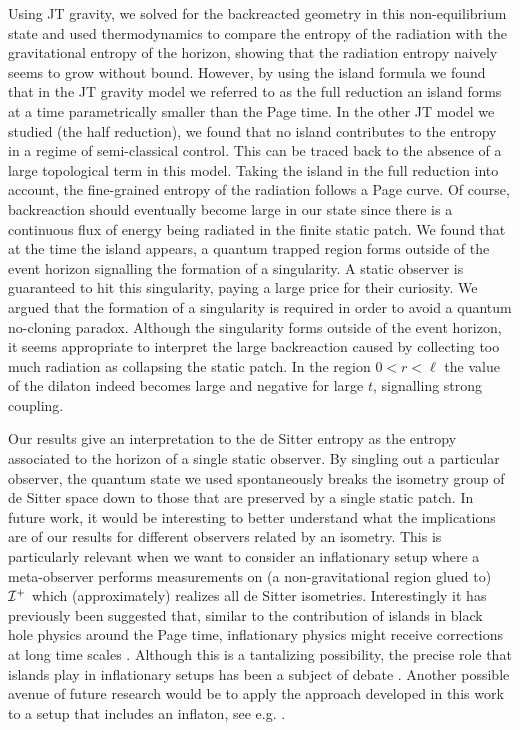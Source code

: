 \documentclass[a4paper,11pt]{article}
\numberwithin{equation}{section}
\begin{document}
Using JT gravity, we solved for the backreacted geometry in this non-equilibrium state and used thermodynamics to compare the entropy of the radiation with the gravitational entropy of the horizon, showing that the radiation entropy naively seems to grow without bound. However, by using the island formula we found that in the JT gravity model we referred to as the full reduction an island forms at a time parametrically smaller than the Page time. In the other JT model we studied (the half reduction), we found that no island contributes to the entropy in a regime of semi-classical control. This can be traced back to the absence of a large topological term in this model. Taking the island in the full reduction into account, the fine-grained entropy of the radiation follows a Page curve. Of course, backreaction should eventually become large in our state since there is a continuous flux of energy being radiated in the finite static patch. We found that at the time the island appears, a quantum trapped region forms outside of the event horizon signalling the formation of a singularity. A static observer is guaranteed to hit this singularity, paying a large price for their curiosity. We argued that the formation of a singularity is required in order to avoid a quantum no-cloning paradox. Although the singularity forms outside of the event horizon, it seems appropriate to interpret the large backreaction caused by collecting too much radiation as collapsing the static patch. In the region $0<r<\ell$ the value of the dilaton indeed becomes large and negative for large $t$, signalling strong coupling.

Our results give an interpretation to the de Sitter entropy as the entropy associated to the horizon of a single static observer. By singling out a particular observer, the quantum state we used spontaneously breaks the isometry group of de Sitter space down to those that are preserved by a single static patch. In future work, it would be interesting to better understand what the implications are of our results for different observers related by an isometry. This is particularly relevant when we want to consider an inflationary setup where a meta-observer performs measurements on (a non-gravitational region glued to) ${\cal I}^+$ which (approximately) realizes all de Sitter isometries. Interestingly it has previously been suggested that, similar to the contribution of islands in black hole physics around the Page time, inflationary physics might receive corrections at long time scales \cite{ArkaniHamed:2007ky}. Although this is a tantalizing possibility, the precise role that islands play in inflationary setups has been a subject of debate \cite{Chen:2020tes,Hartman:2020khs}. Another possible avenue of future research would be to apply the approach developed in this work to a setup that includes an inflaton, see e.g. \cite{Manu:2020tty}.
\end{document}
